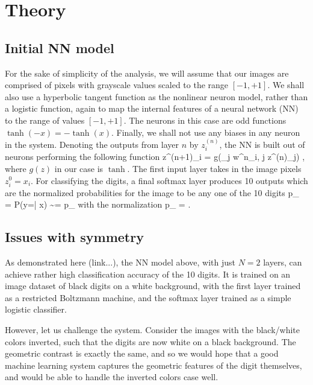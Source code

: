 \documentclass[twocolumn, prl]{revtex4-1}
\begin{document}

\section{Theory}
\subsection{Initial NN model}
\label{Sec:dumb_NN}

For the sake of simplicity of the analysis, we will assume that our images are comprised of pixels with grayscale values scaled to the 
range $[-1,+1]$. We shall also use a hyperbolic tangent function as the nonlinear neuron model, rather than a logistic function, again to map the internal features of a neural network (NN) to the range of values $[-1, +1]$. The neurons in this case are odd functions $\tanh(-x) = - \tanh(x)$.
Finally, we shall not use any biases in any neuron in the system. Denoting the outputs from layer $n$ by $z^{(n)}_i$, the NN is built out of neurons performing the following function
\be
z^{(n+1)}_i = g\left(\sum_j w^n_{i, j} z^{(n)}_j\right)
\; ,
\ee
where $g(z)$ in our case is $\tanh$.
The first input layer takes in the image pixels $z^0_i = x_i$. For classifying the digits, a final softmax layer produces 10 outputs which are the normalized probabilities for the image to be any one of the 10 digits
\be
p_{\alpha} = P(y=\alpha | x) \sim \exp{} = {\tilde p}_{\alpha}
\ee
with the normalization
\be
p_{\alpha} = 
\; .
\ee

\subsection{Issues with symmetry}

As demonstrated here (link...), the NN model above, with just $N=2$ layers, can achieve rather high classification accuracy of the 10 digits.
It is trained on an image dataset of black digits on a white background, with the first layer trained as a restricted Boltzmann machine, and the softmax layer trained as a simple logistic classifier.

However, let us challenge the system. Consider the images with the black/white colors inverted, such that the digits are now white on 
a black background. The geometric contrast is exactly the same, and so we would hope that a good machine learning system captures the geometric features of the digit themselves, and would be able to handle the inverted colors case well.
\end{document}
